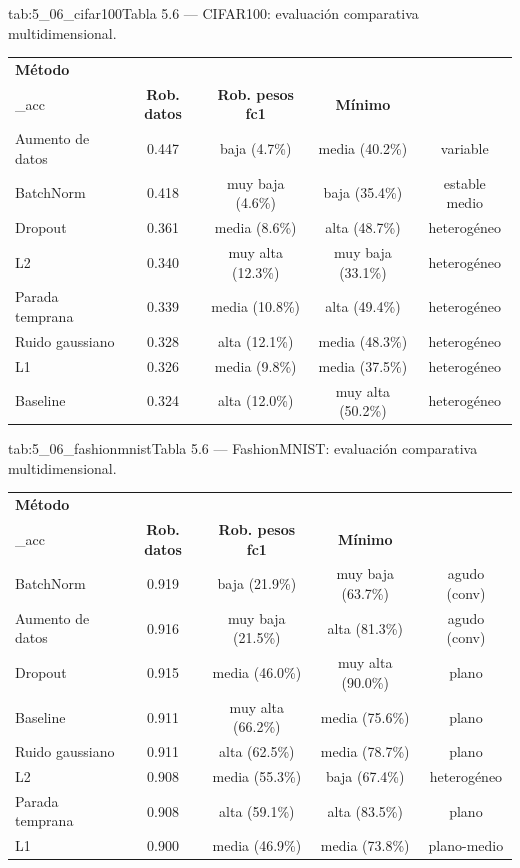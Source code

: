 \begin{table}{tab:5_06_cifar100}{Tabla 5.6 — CIFAR100: evaluación comparativa multidimensional.}
\small
\begin{tabular}{lcccc}
\toprule
\textbf{Método} & \textbf{val\\_acc} & \textbf{Rob. datos} & \textbf{Rob. pesos fc1} & \textbf{Mínimo} \\
\midrule
Aumento de datos & 0.447 & baja (4.7\%) & media (40.2\%) & variable \\
BatchNorm & 0.418 & muy baja (4.6\%) & baja (35.4\%) & estable medio \\
Dropout & 0.361 & media (8.6\%) & alta (48.7\%) & heterogéneo \\
L2 & 0.340 & muy alta (12.3\%) & muy baja (33.1\%) & heterogéneo \\
Parada temprana & 0.339 & media (10.8\%) & alta (49.4\%) & heterogéneo \\
Ruido gaussiano & 0.328 & alta (12.1\%) & media (48.3\%) & heterogéneo \\
L1 & 0.326 & media (9.8\%) & media (37.5\%) & heterogéneo \\
Baseline & 0.324 & alta (12.0\%) & muy alta (50.2\%) & heterogéneo \\
\bottomrule
\end{tabular}
\end{table}

\begin{table}{tab:5_06_fashionmnist}{Tabla 5.6 — FashionMNIST: evaluación comparativa multidimensional.}
\small
\begin{tabular}{lcccc}
\toprule
\textbf{Método} & \textbf{val\\_acc} & \textbf{Rob. datos} & \textbf{Rob. pesos fc1} & \textbf{Mínimo} \\
\midrule
BatchNorm & 0.919 & baja (21.9\%) & muy baja (63.7\%) & agudo (conv) \\
Aumento de datos & 0.916 & muy baja (21.5\%) & alta (81.3\%) & agudo (conv) \\
Dropout & 0.915 & media (46.0\%) & muy alta (90.0\%) & plano \\
Baseline & 0.911 & muy alta (66.2\%) & media (75.6\%) & plano \\
Ruido gaussiano & 0.911 & alta (62.5\%) & media (78.7\%) & plano \\
L2 & 0.908 & media (55.3\%) & baja (67.4\%) & heterogéneo \\
Parada temprana & 0.908 & alta (59.1\%) & alta (83.5\%) & plano \\
L1 & 0.900 & media (46.9\%) & media (73.8\%) & plano-medio \\
\bottomrule
\end{tabular}
\end{table}